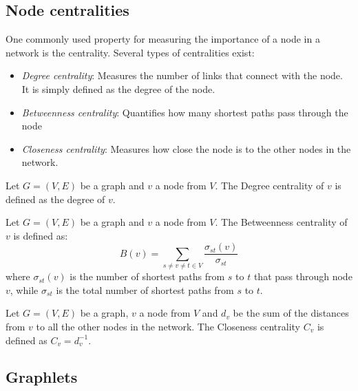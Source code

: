 \subsection{Node centralities}

One commonly used property for measuring the importance of a node in a
network is the centrality. Several types of centralities exist:
\begin{itemize}
 \item \emph{Degree centrality}: Measures the number of links that connect with the
node. It is simply defined as the degree of the node.
 \item \emph{Betweenness centrality}: Quantifies how many shortest paths pass through
the node
 \item \emph{Closeness centrality}: Measures how close the node is to the other nodes
in the network.
\end{itemize}

\begin{mydef}
Let $G=(V,E)$ be a graph and $v$ a node from $V$. The Degree centrality of $v$ is defined as the degree of $v$.
\end{mydef}

\begin{mydef}
Let $G=(V,E)$ be a graph and $v$ a node from $V$. The Betweenness centrality of $v$ is defined as:
$$ B(v) = \sum_{s \ne v \ne t \in V}\frac{\sigma_{st}(v)}{\sigma_{st}}$$
where $\sigma_{st}(v) $ is the number of shortest paths from $s$ to $t$ that pass
through node $v$, while $ \sigma_{st} $ is the total number of shortest paths
from $s$ to $t$.
\end{mydef}


\begin{mydef}

Let $G=(V,E)$ be a graph, $v$ a node from $V$ and $d_v$ be the sum of the distances from $v$ to
all the other nodes in the network. The Closeness centrality $C_v$ is
defined as $C_v = d_v^{-1}$. 
\end{mydef}


\subsection{Graphlets}
\label{sec:graphlets}

